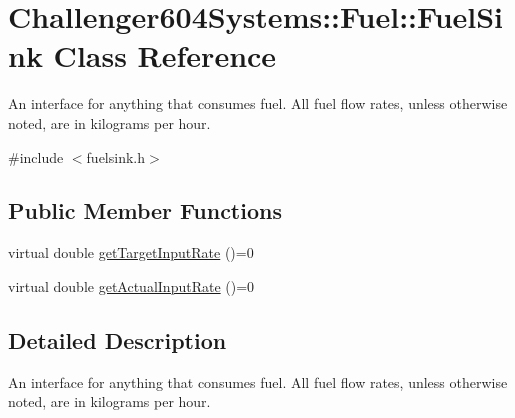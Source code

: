 \hypertarget{class_challenger604_systems_1_1_fuel_1_1_fuel_sink}{\section{Challenger604\-Systems\-:\-:Fuel\-:\-:Fuel\-Sink Class Reference}
\label{class_challenger604_systems_1_1_fuel_1_1_fuel_sink}
}


An interface for anything that consumes fuel. All fuel flow rates, unless otherwise noted, are in kilograms per hour.  




{\ttfamily \#include $<$fuelsink.\-h$>$}

\subsection*{Public Member Functions}
\begin{DoxyCompactItemize}
\item 
virtual double \hyperlink{class_challenger604_systems_1_1_fuel_1_1_fuel_sink_a909e272f4d9da3389f226590aacac50a}{get\-Target\-Input\-Rate} ()=0
\item 
virtual double \hyperlink{class_challenger604_systems_1_1_fuel_1_1_fuel_sink_a92372b9df8c5c2898bf4b2a140ca65f3}{get\-Actual\-Input\-Rate} ()=0
\end{DoxyCompactItemize}


\subsection{Detailed Description}
An interface for anything that consumes fuel. All fuel flow rates, unless otherwise noted, are in kilograms per hour. 


